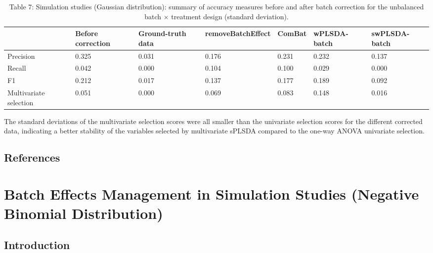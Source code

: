 \documentclass[
]{book}
\begin{document}
\begin{table}

\caption{\label{tab:unnamed-chunk-108}Table 7: Simulation studies (Gaussian distribution): summary of accuracy measures before and after batch correction for the unbalanced batch × treatment design (standard deviation).}
\centering
\begin{tabular}[t]{l|l|l|l|l|l|l}
\hline
  & Before correction & Ground-truth data & removeBatchEffect & ComBat & wPLSDA-batch & swPLSDA-batch\\
\hline
Precision & 0.325 & 0.031 & 0.176 & 0.231 & 0.232 & 0.137\\
\hline
Recall & 0.042 & 0.000 & 0.104 & 0.100 & 0.029 & 0.000\\
\hline
F1 & 0.212 & 0.017 & 0.137 & 0.177 & 0.189 & 0.092\\
\hline
Multivariate selection & 0.051 & 0.000 & 0.069 & 0.083 & 0.148 & 0.016\\
\hline
\end{tabular}
\end{table}

The standard deviations of the multivariate selection scores were all smaller than the univariate selection scores for the different corrected data, indicating a better stability of the variables selected by multivariate sPLSDA compared to the one-way ANOVA univariate selection.

\hypertarget{references-2}{%
\section{References}\label{references-2}}

\hypertarget{batch-effects-management-in-simulation-studies-negative-binomial-distribution}{%
\chapter{Batch Effects Management in Simulation Studies (Negative Binomial Distribution)}\label{batch-effects-management-in-simulation-studies-negative-binomial-distribution}}

\hypertarget{introduction-2}{%
\section{Introduction}\label{introduction-2}}
\end{document}
